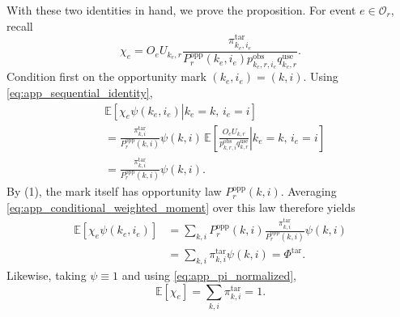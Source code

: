 With these two identities in hand, we prove the proposition.
For event $e\in\mathcal{O}_r$, recall
\begin{equation}
 \chi_e
 =
 O_eU_{k_e,r}
 \frac{
 \pi^{\mathrm{tar}}_{k_e,i_e}
 }{
 P_r^{\mathrm{opp}}(k_e,i_e)
 p^{\mathrm{obs}}_{k_e,r,i_e}
 q^{\mathrm{use}}_{k_e,r}
 }.
 \label{eq:app_chi}
\end{equation}
Condition first on the opportunity mark $(k_e,i_e)=(k,i)$.  Using
\eqref{eq:app_sequential_identity},
\begin{align}
 &\mathbb{E}
 \left[
 \left.
 \chi_e\psi(k_e,i_e)
 \right|
 k_e=k,\,
 i_e=i
 \right]
 \nonumber\\
 &=
 \frac{
 \pi^{\mathrm{tar}}_{k,i}
 }{
 P_r^{\mathrm{opp}}(k,i)
 }
 \psi(k,i)
 \,
 \mathbb{E}
 \left[
 \left.
 \frac{
 O_eU_{k,r}
 }{
 p^{\mathrm{obs}}_{k,r,i}
 q^{\mathrm{use}}_{k,r}
 }
 \right|
 k_e=k,\,
 i_e=i
 \right]
 \nonumber\\
 &=
 \frac{
 \pi^{\mathrm{tar}}_{k,i}
 }{
 P_r^{\mathrm{opp}}(k,i)
 }
 \psi(k,i).
 \label{eq:app_conditional_weighted_moment}
\end{align}
By (1), the mark itself has opportunity law
$P_r^{\mathrm{opp}}(k,i)$.  Averaging
\eqref{eq:app_conditional_weighted_moment} over this law therefore yields
\begin{align}
 \mathbb{E}
 \left[
 \chi_e\psi(k_e,i_e)
 \right]
 &=
 \sum_{k,i}
 P_r^{\mathrm{opp}}(k,i)
 \frac{
 \pi^{\mathrm{tar}}_{k,i}
 }{
 P_r^{\mathrm{opp}}(k,i)
 }
 \psi(k,i)
 \nonumber\\
 &=
 \sum_{k,i}
 \pi^{\mathrm{tar}}_{k,i}\psi(k,i)
 =
 \Phi^{\mathrm{tar}}.
 \label{eq:app_expected_numerator_event}
\end{align}
Likewise, taking $\psi\equiv1$ and using
\eqref{eq:app_pi_normalized},
\begin{equation}
    \mathbb{E}[\chi_e]
    =
    \sum_{k,i}\pi^{\mathrm{tar}}_{k,i}
    =1.
    \label{eq:app_expected_denominator_event}
\end{equation}

